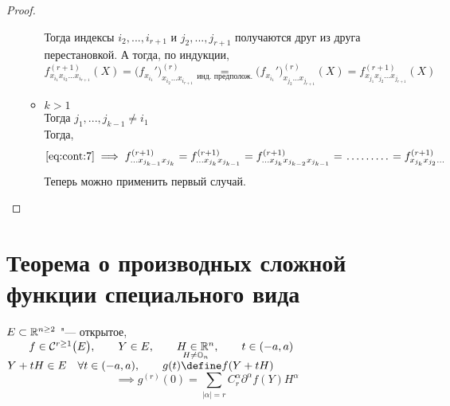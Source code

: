 \begin{proof}
\begin{itemize}
\begin{itemize}
			Тогда индексы $ i_2, ..., i_{r + 1} $ и $ j_2, ..., j_{r + 1} $ получаются друг из друга перестановкой. А тогда, по индукции,
			$$ f_{x_{i_1}x_{i_2}...x_{i_{r + 1}}}^{(r + 1)}(X) = \bigg( f_{x_{i_1}}' \bigg)_{x_{i_2}...x_{i_{r + 1}}}^{(r)} \underset{\text{инд. предполож.}}= \bigg( f_{x_{i_1}}' \bigg)^{(r)}_{x_{j_2}...x_{j_{r + 1}}}(X) = f_{x_{j_1}x_{j_2}...x_{j_{r + 1}}}^{(r + 1)}(X) $$
			\item $ k > 1 $ \\
			Тогда $ j_1, ..., j_{k - 1} \ne i_1 $ \\
			Тогда,
			$$ \eref{cont:7} \implies f_{...x_{j_{k - 1}}x_{j_k}}^{(r + 1)} = f_{...x_{j_k}x_{j_{k - 1}}}^{(r + 1)} = f_{...x_{j_k}x_{j_{k - 2}}x_{j_{k - 1}}}^{(r + 1)} = \widedots[4em] = f_{x_{j_k}x_{j_2}...}^{(r + 1)} $$
			Теперь можно применить первый случай.
		\end{itemize}
	\end{itemize}
\end{proof}

\section{Теорема о производных сложной функции специального вида}
\begin{theorem}
	$ E \sub \R^{n \ge 2} $ "--- открытое, $ \qquad f \in \Cont[r \ge 1]{E}, \qquad Y \in E, \qquad \underset{H \ne \On}{H \in \R^n}, \qquad t \in (-a, a) $ \\
	$ Y + tH \in E \quad \forall t \in (-a, a), \qquad g(t) \define f(Y + tH) $
	$$ \implies g^{(r)}(0) = \sum_{|\alpha| = r} C_r^\alpha \partial^\alpha f(Y) H^\alpha $$
\end{theorem}

